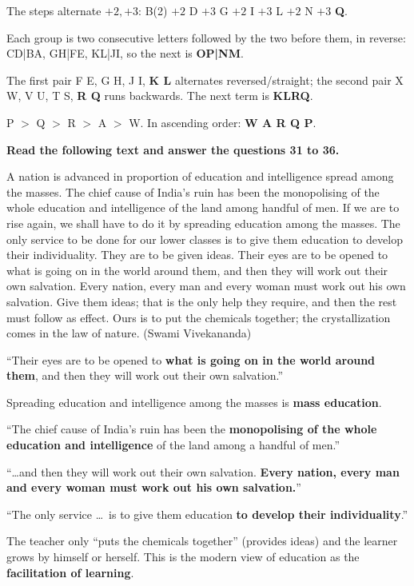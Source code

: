 The steps alternate $+2, +3$: B(2) $+2$ D $+3$ G $+2$ I $+3$ L $+2$ N $+3$ \textbf{Q}.

Each group is two consecutive letters followed by the two before them, in reverse: CD|BA, GH|FE, KL|JI, so the next is \textbf{OP|NM}.

The first pair F E, G H, J I, \textbf{K L} alternates reversed/straight; the second pair X W, V U, T S, \textbf{R Q} runs backwards. The next term is \textbf{KLRQ}.

P $>$ Q $>$ R $>$ A $>$ W. In ascending order: \textbf{W A R Q P}.

\textbf{Read the following text and answer the questions 31 to 36.}\par\smallskip
A nation is advanced in proportion of education and intelligence spread among the masses. The chief cause of India's ruin has been the monopolising of the whole education and intelligence of the land among handful of men. If we are to rise again, we shall have to do it by spreading education among the masses. The only service to be done for our lower classes is to give them education to develop their individuality. They are to be given ideas. Their eyes are to be opened to what is going on in the world around them, and then they will work out their own salvation. Every nation, every man and every woman must work out his own salvation. Give them ideas; that is the only help they require, and then the rest must follow as effect. Ours is to put the chemicals together; the crystallization comes in the law of nature. \hfill (Swami Vivekananda)

``Their eyes are to be opened to \textbf{what is going on in the world around them}, and then they will work out their own salvation.''

Spreading education and intelligence among the masses is \textbf{mass education}.

``The chief cause of India's ruin has been the \textbf{monopolising of the whole education and intelligence} of the land among a handful of men.''

``\ldots and then they will work out their own salvation. \textbf{Every nation, every man and every woman must work out his own salvation.}''

``The only service \ldots\ is to give them education \textbf{to develop their individuality}.''

The teacher only ``puts the chemicals together'' (provides ideas) and the learner grows by himself or herself. This is the modern view of education as the \textbf{facilitation of learning}.

